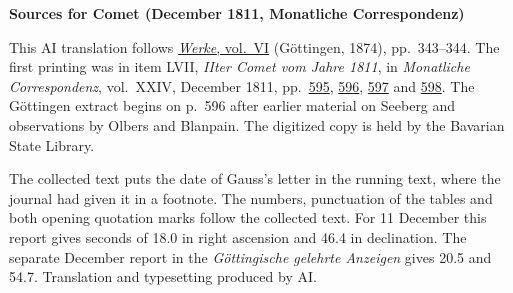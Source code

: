 \clearpage\thispagestyle{empty}
\begin{center}\textbf{Sources for Comet (December 1811, Monatliche Correspondenz)}\end{center}
\noindent This AI translation follows \href{https://gdz.sub.uni-goettingen.de/id/PPN236007467}{\textit{Werke}, vol.~VI} (Göttingen, 1874), pp.~343--344. The first printing was in item LVII, \textit{IIter Comet vom Jahre 1811}, in \textit{Monatliche Correspondenz}, vol.~XXIV, December 1811, pp.~\href{https://api.digitale-sammlungen.de/iiif/image/v2/bsb10538613_00611/full/1600,/0/default.jpg}{595}, \href{https://api.digitale-sammlungen.de/iiif/image/v2/bsb10538613_00612/full/1600,/0/default.jpg}{596}, \href{https://api.digitale-sammlungen.de/iiif/image/v2/bsb10538613_00613/full/1600,/0/default.jpg}{597} and \href{https://api.digitale-sammlungen.de/iiif/image/v2/bsb10538613_00614/full/1600,/0/default.jpg}{598}. The Göttingen extract begins on p.~596 after earlier material on Seeberg and observations by Olbers and Blanpain. The digitized copy is held by the Bavarian State Library.
\par\smallskip\noindent The collected text puts the date of Gauss’s letter in the running text, where the journal had given it in a footnote. The numbers, punctuation of the tables and both opening quotation marks follow the collected text. For 11 December this report gives seconds of 18.0 in right ascension and 46.4 in declination. The separate December report in the \textit{Göttingische gelehrte Anzeigen} gives 20.5 and 54.7. Translation and typesetting produced by AI.
\clearpage
